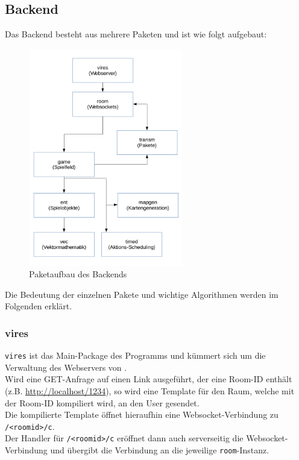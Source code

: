 \subsection{Backend}
Das Backend besteht aus mehrere Paketen und ist wie folgt aufgebaut:
\begin{figure}[H]
	\centering
	\includegraphics[width=0.6\textwidth]{Architektur.png}
	\caption{Paketaufbau des Backends}
\end{figure}
Die Bedeutung der einzelnen Pakete und wichtige Algorithmen werden im Folgenden erklärt.

\subsubsection{vires}
\verb+vires+ ist das Main-Package des Programms und kümmert sich um die Verwaltung des Webservers von \vires. \\
Wird eine GET-Anfrage auf einen Link ausgeführt, der eine Room-ID enthält (z.B. \url{http://localhost/1234}), so wird eine Template für den Raum, welche mit der Room-ID kompiliert wird, an den User gesendet. \\
Die kompilierte Template öffnet hieraufhin eine Websocket-Verbindung zu \verb+/<roomid>/c+. \\
Der Handler für \verb+/<roomid>/c+ eröffnet dann auch serverseitig die Websocket-Verbindung und übergibt die Verbindung an die jeweilige \verb+room+-Instanz.

